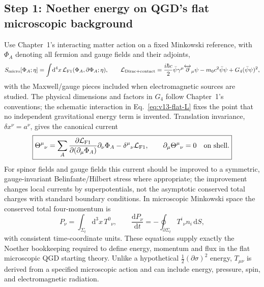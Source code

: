 \documentclass[11pt,a4paper]{article}
\theoremstyle{definition}\newtheorem{definition}[theorem]{Definition}
\theoremstyle{remark}\newtheorem{remark}[theorem]{Remark}
\newcommand{\dd}{\mathrm d}
\begin{document}
\subsection{Step 1: Noether energy on QGD's flat microscopic background}
\label{sec:v13-microscopic-noether}
Use Chapter~1's interacting matter action on a fixed Minkowski reference,
with $\Phi_A$ denoting all fermion and gauge fields and their adjoints,
\begin{equation}\label{eq:v13-flat-L}
S_{\rm micro}[\Phi_A;\eta]=\int\!\dd^4x\,
\mathcal L_{\rm F1}(\Phi_A,\partial\Phi_A;\eta),\qquad
\mathcal L_{\rm Dirac+contact}=\frac{i\hbar c}{2}
\bar\psi\gamma^\mu\overleftrightarrow{\partial}_\mu\psi
-m_0c^2\bar\psi\psi+G_4(\bar\psi\psi)^2,
\end{equation}
with the Maxwell/gauge pieces included when electromagnetic sources are
studied.  The physical dimensions and factors in $G_4$ follow Chapter~1's
conventions; the schematic interaction in Eq.~\eqref{eq:v13-flat-L}
fixes the point that no independent gravitational energy term is invented.
Translation invariance, $\delta x^\nu=a^\nu$, gives the canonical current
\begin{equation}\label{eq:v13-Tcan}
\boxed{\Theta^\mu{}_{\nu}=\sum_A
\frac{\partial\mathcal L_{\rm F1}}{\partial(\partial_\mu\Phi_A)}
\partial_\nu\Phi_A-\delta^\mu{}_{\nu}\mathcal L_{\rm F1},
\qquad \partial_\mu\Theta^\mu{}_{\nu}=0\quad\text{on shell}.}
\end{equation}
For spinor fields and gauge fields this current should be improved to a
symmetric, gauge-invariant Belinfante/Hilbert stress where appropriate;
the improvement changes local currents by superpotentials, not the
asymptotic conserved total charges with standard boundary conditions.
In microscopic Minkowski space the conserved total four-momentum is
\begin{equation}\label{eq:v13-P}
\boxed{P_\nu=\int_{\Sigma_t}\!\dd^3x\,T^0{}_{\nu},
\qquad \frac{\dd P_\nu}{\dd t}=-\oint_{\partial\Sigma_t}
T^i{}_{\nu}n_i\,\dd S,}
\end{equation}
with consistent time-coordinate units.  These equations supply exactly the
Noether bookkeeping required to define energy, momentum and flux in the
flat microscopic QGD starting theory.  Unlike a hypothetical
$\frac12(\partial\sigma)^2$ energy, $T_{\mu\nu}$ is derived from a
specified microscopic action and can include energy, pressure, spin,
and electromagnetic radiation.
\end{document}
